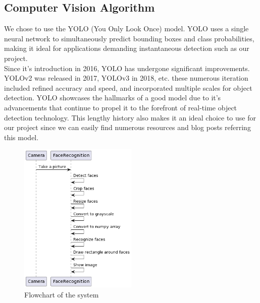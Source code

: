 \subsection{Computer Vision Algorithm}
\label{subsec:Computer Vision Algorithm - YOLOv6}
We chose to use the YOLO (You Only Look Once) \cite{YOLO} model. YOLO uses a single neural network to simultaneously predict bounding boxes and class probabilities, making it ideal for applications demanding instantaneous detection such as our project. \\
Since it's introduction in 2016, YOLO has undergone significant improvements. YOLOv2 was released in 2017, YOLOv3 in 2018, etc. these numerous iteration included refined accuracy and speed, and incorporated multiple scales for object detection. YOLO showcases the hallmarks of a good model due to it's advancements that continue to propel it to the forefront of real-time object detection technology. This lengthy history also makes it an ideal choice to use for our project since we can easily find numerous resources and blog posts referring this model.\\
\begin{figure}[h]
    \centering
    \includegraphics[width=0.5\textwidth]{images/Diagram-1.png}
    \caption{Flowchart of the system}
    \label{fig:flowchart}
\end{figure}

